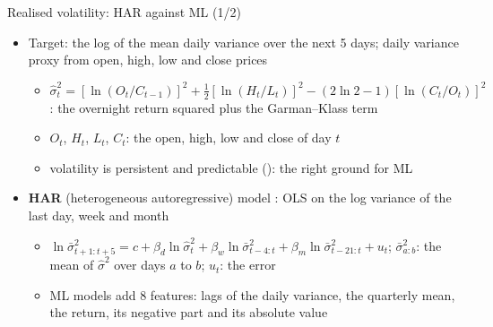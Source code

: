 \begin{frame}{Realised volatility: HAR against ML (1/2)}
\itemsize{\footnotesize}
\begin{itemize}
    \item Target: the log of the mean daily variance over the next 5 days; daily variance proxy from open, high, low and close prices 
    \begin{itemize}
        \item $\hat\sigma_t^2 = [\ln(O_t/C_{t-1})]^2 + \frac12[\ln(H_t/L_t)]^2 - (2\ln 2 - 1)[\ln(C_t/O_t)]^2$: the overnight return squared plus the Garman--Klass term
        \item $O_t$, $H_t$, $L_t$, $C_t$: the open, high, low and close of day $t$
        \item volatility is persistent and predictable (): the right ground for ML
    \end{itemize}
    \item \textbf{HAR} (heterogeneous autoregressive) model : OLS on the log variance of the last day, week and month
    \begin{itemize}
        \item $\ln \bar\sigma^2_{t+1:t+5} = c + \beta_d \ln\hat\sigma_t^2 + \beta_w \ln\bar\sigma^2_{t-4:t} + \beta_m \ln\bar\sigma^2_{t-21:t} + u_t$; $\bar\sigma^2_{a:b}$: the mean of $\hat\sigma^2$ over days $a$ to $b$; $u_t$: the error
        \item ML models add 8 features: lags of the daily variance, the quarterly mean, the return, its negative part and its absolute value
    \end{itemize}
\end{itemize}
\end{frame}

